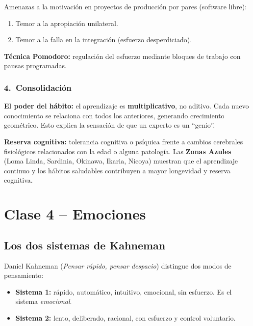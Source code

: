 \documentclass[11pt, a4paper]{article}
\begin{document}
Amenazas a la motivaci\'on en proyectos de producci\'on por pares (software libre):
\begin{enumerate}[nosep]
    \item Temor a la apropiaci\'on unilateral.
    \item Temor a la falla en la integraci\'on (esfuerzo desperdiciado).
\end{enumerate}

\textbf{T\'ecnica Pomodoro:} regulaci\'on del esfuerzo mediante bloques de trabajo con pausas programadas.

\subsubsection{4.\ Consolidaci\'on}

\textbf{El poder del h\'abito:} el aprendizaje es \textbf{multiplicativo}, no aditivo. Cada nuevo conocimiento se relaciona con todos los anteriores, generando crecimiento geom\'etrico. Esto explica la sensaci\'on de que un experto es un ``genio''.

\textbf{Reserva cognitiva:} tolerancia cognitiva o ps\'iquica frente a cambios cerebrales fisiol\'ogicos relacionados con la edad o alguna patolog\'ia. Las \textbf{Zonas Azules} (Loma Linda, Sardinia, Okinawa, Ikaria, Nicoya) muestran que el aprendizaje continuo y los h\'abitos saludables contribuyen a mayor longevidad y reserva cognitiva.

\section{Clase 4 -- Emociones}

\subsection{Los dos sistemas de Kahneman}

Daniel Kahneman (\textit{Pensar r\'apido, pensar despacio}) distingue dos modos de pensamiento:
\begin{itemize}[nosep]
    \item \textbf{Sistema 1:} r\'apido, autom\'atico, intuitivo, emocional, sin esfuerzo. Es el sistema \emph{emocional}.
    \item \textbf{Sistema 2:} lento, deliberado, racional, con esfuerzo y control voluntario.
\end{itemize}
\end{document}
